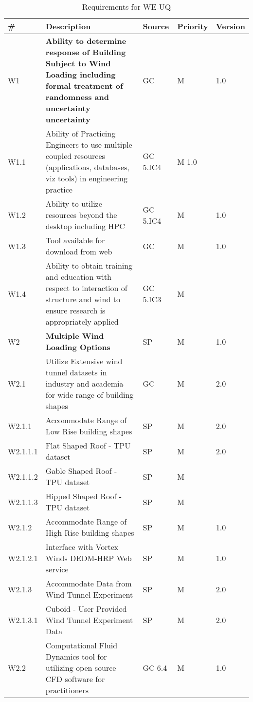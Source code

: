 \begin{longtable}{| p{} | p{} | p{} | p{} |  p{} |}

\caption{Requirements for WE-UQ}
  \label{tab:featureRequirements}  
    \\
   \hline
\rowcolor{lightgray}
\# & Description & Source & Priority & Version \\ \hline

W1 & \textbf{Ability to determine response of Building Subject to Wind Loading including formal treatment of randomness and uncertainty uncertainty} & GC & M & 1.0  \\ \hline
W1.1 & Ability of Practicing Engineers to use multiple coupled resources (applications, databases, viz tools) in engineering practice & GC 5.IC4 & M 1.0 & \\ \hline
W1.2 & Ability to utilize resources beyond the desktop including HPC & GC 5.IC4 & M & 1.0 \\ \hline
W1.3 & Tool available for download from web & GC & M & 1.0 \\ \hline
W1.4 & Ability to obtain training and education with respect to interaction of structure and wind to ensure research is appropriately applied  & GC 5.IC3 & M & \\ \hline
W2 & \textbf{Multiple Wind Loading Options } & SP & M & 1.0 \\ \hline
W2.1 & Utilize Extensive wind tunnel datasets in industry and academia for wide range of building shapes & GC & M & 2.0 \\ \hline
W2.1.1 & Accommodate Range of Low Rise building shapes & SP & M & 2.0 \\ \hline
W2.1.1.1 & Flat Shaped Roof - TPU dataset & SP & M & 2.0 \\ \hline
W2.1.1.2 & Gable Shaped Roof - TPU dataset & SP & M & \\ \hline
W2.1.1.3 & Hipped Shaped Roof - TPU dataset & SP & M & \\ \hline
W2.1.2 & Accommodate Range of High Rise building shapes & SP & M & 1.0 \\ \hline
W2.1.2.1 & Interface with Vortex Winds DEDM-HRP Web service & SP & M & 1.0 \\ \hline
W2.1.3 & Accommodate Data from Wind Tunnel Experiment & SP & M & 2.0 \\ \hline
W2.1.3.1 & Cuboid - User Provided Wind Tunnel Experiment Data  & SP & M & 2.0 \\ \hline
W2.2 & Computational Fluid Dynamics tool for utilizing open source CFD software for practitioners & GC 6.4 & M & 1.0 \\ \hline

\end{longtable}
